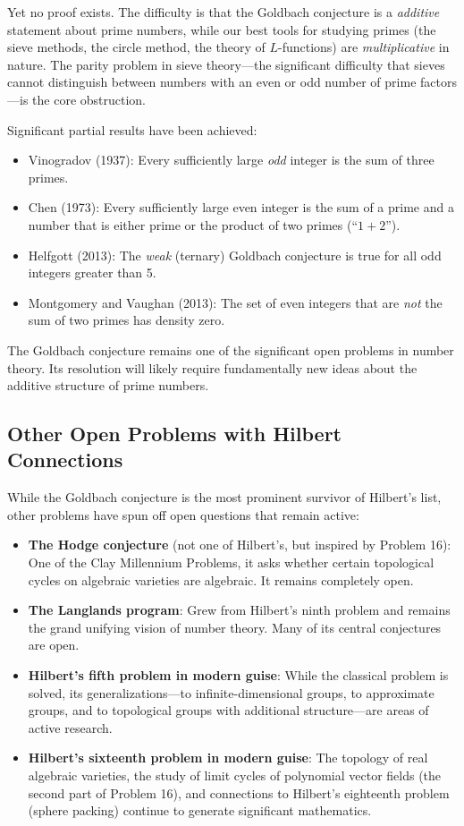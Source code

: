 Yet no proof exists. The difficulty is that the Goldbach conjecture is a \emph{additive} statement about prime numbers, while our best tools for studying primes (the sieve methods, the circle method, the theory of $L$-functions) are \emph{multiplicative} in nature. The parity problem in sieve theory---the significant difficulty that sieves cannot distinguish between numbers with an even or odd number of prime factors---is the core obstruction.

Significant partial results have been achieved:
\begin{itemize}
    \item Vinogradov (1937): Every sufficiently large \emph{odd} integer is the sum of three primes.
    \item Chen (1973): Every sufficiently large even integer is the sum of a prime and a number that is either prime or the product of two primes (``$1 + 2$'').
    \item Helfgott (2013): The \emph{weak} (ternary) Goldbach conjecture is true for all odd integers greater than 5.
    \item Montgomery and Vaughan (2013): The set of even integers that are \emph{not} the sum of two primes has density zero.
\end{itemize}

The Goldbach conjecture remains one of the significant open problems in number theory. Its resolution will likely require fundamentally new ideas about the additive structure of prime numbers.

\subsection{Other Open Problems with Hilbert Connections}

While the Goldbach conjecture is the most prominent survivor of Hilbert's list, other problems have spun off open questions that remain active:

\begin{itemize}
    \item \textbf{The Hodge conjecture} (not one of Hilbert's, but inspired by Problem 16): One of the Clay Millennium Problems, it asks whether certain topological cycles on algebraic varieties are algebraic. It remains completely open.
    \item \textbf{The Langlands program}: Grew from Hilbert's ninth problem and remains the grand unifying vision of number theory. Many of its central conjectures are open.
    \item \textbf{Hilbert's fifth problem in modern guise}: While the classical problem is solved, its generalizations---to infinite-dimensional groups, to approximate groups, and to topological groups with additional structure---are areas of active research.
    \item \textbf{Hilbert's sixteenth problem in modern guise}: The topology of real algebraic varieties, the study of limit cycles of polynomial vector fields (the second part of Problem 16), and connections to Hilbert's eighteenth problem (sphere packing) continue to generate significant mathematics.
\end{itemize}

